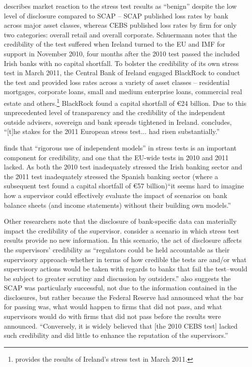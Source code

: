 \documentclass[12pt]{article}
\begin{document}
\citet{Schuermann2011} describes market reaction to the stress test results as ``benign'' despite the low level of disclosure compared to SCAP -- SCAP published loss rates by bank across major asset classes, whereas CEBS published loss rates by firm for only two categories: overall retail and overall corporate. Schuermann notes that the credibility of the test suffered when Ireland turned to the EU and IMF for support in November 2010, four months after the 2010 test passed the included Irish banks with no capital shortfall. To bolster the credibility of its own stress test in March 2011, the Central Bank of Ireland engaged BlackRock to conduct the test and provided loss rates across a variety of asset classes -- residential mortgages, corporate loans, small and medium enterprise loans, commercial real estate and others.\footnote{\citet{Ireland} provides the results of Ireland's stress test in March 2011.} BlackRock found a capital shortfall of \euro{24} billion. Due to this unprecedented level of transparency and the credibility of the independent outside advisers, sovereign and bank spreads tightened in Ireland. \citet{Schuermann2011} concludes, ``[t]he stakes for the 2011 European stress test... had risen substantially.''

\citet{Schuermann2016} finds that ``rigorous use of independent models'' in stress tests is an important component for credibility, and one that the EU-wide tests in 2010 and 2011 lacked. As both the 2010 test inadequately stressed the Irish banking sector and the 2011 test inadequately stressed the Spanish banking sector (where a subsequent test found a capital shortfall of \euro{57} billion)``it seems hard to imagine how a supervisor could effectively evaluate the impact of scenarios on bank balance sheets (and income statements) without their building own models.''

Other researchers note that the disclosure of bank-specific data can materially impact the credibility of the supervisor. \citet{Itay} consider a scenario in which stress test results provide no new information. In this scenario, the act of disclosure affects the supervisors' credibility as ``regulators could be held accountable as their supervisory approach--whether in terms of how credible the tests are and/or what supervisory actions would be taken with regards to banks that fail the test--would be subject to greater scrutiny and discussion by outsiders.'' \citet{Itay} also suggests the SCAP was particularly successful, not due to the information contained in the disclosures, but rather because the Federal Reserve had announced what the bar for passing was, what would happen to firms that did not pass, and what supervisors would do with firms that did not pass before the results were announced. ``Conversely, it is widely believed that [the 2010 CEBS test] lacked such credibility and did little to enhance the reputation of the supervisors.''
\end{document}
